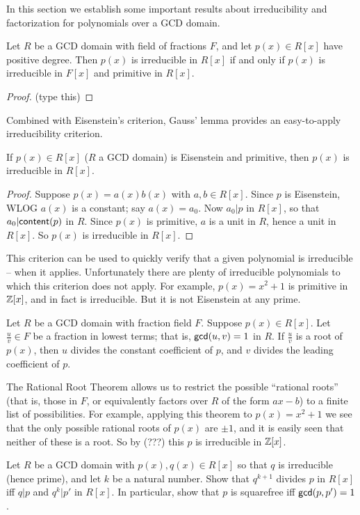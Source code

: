 In this section we establish some important results about irreducibility and factorization for polynomials over a GCD domain.

\begin{prop}
Let \(R\) be a GCD domain with field of fractions \(F\), and let \(p(x) \in R[x]\) have positive degree. Then \(p(x)\) is irreducible in \(R[x]\) if and only if \(p(x)\) is irreducible in \(F[x]\) and primitive in \(R[x]\).
\end{prop}

\begin{proof}
(type this)
\end{proof}

Combined with Eisenstein's criterion, Gauss' lemma provides an easy-to-apply irreducibility criterion.

\begin{cor}
If \(p(x) \in R[x]\) (\(R\) a GCD domain) is Eisenstein and primitive, then \(p(x)\) is irreducible in \(R[x]\).
\end{cor}

\begin{proof}
Suppose \(p(x) = a(x)b(x)\) with \(a,b \in R[x]\). Since \(p\) is Eisenstein, WLOG \(a(x)\) is a constant; say \(a(x) = a_0\). Now \(a_0|p\) in \(R[x]\), so that \(a_0|\mathsf{content}(p)\) in \(R\). Since \(p(x)\) is primitive, \(a\) is a unit in \(R\), hence a unit in \(R[x]\). So \(p(x)\) is irreducible in \(R[x]\).
\end{proof}

This criterion can be used to quickly verify that a given polynomial is irreducible -- when it applies. Unfortunately there are plenty of irreducible polynomials to which this criterion does not apply. For example, \(p(x) = x^2 + 1\) is primitive in \(\mathbb{Z}[x]\), and in fact is irreducible. But it is not Eisenstein at any prime.

\begin{prop}
Let \(R\) be a GCD domain with fraction field \(F\). Suppose \(p(x) \in R[x]\). Let \(\frac{u}{v} \in F\) be a fraction in lowest terms; that is, \(\mathsf{gcd}(u, v) = 1\) in \(R\). If \(\frac{u}{v}\) is a root of \(p(x)\), then \(u\) divides the constant coefficient of \(p\), and \(v\) divides the leading coefficient of \(p\).
\end{prop}

The Rational Root Theorem allows us to restrict the possible ``rational roots'' (that is, those in \(F\), or equivalently factors over \(R\) of the form \(ax-b\)) to a finite list of possibilities. For example, applying this theorem to \(p(x) = x^2 + 1\) we see that the only possible rational roots of \(p(x)\) are \(\pm 1\), and it is easily seen that neither of these is a root. So by (???) this \(p\) is irreducible in \(\mathbb{Z}[x]\).

\Exercises%

\begin{exercise}
Let \(R\) be a GCD domain with \(p(x), q(x) \in R[x]\) so that \(q\) is irreducible (hence prime), and let \(k\) be a natural number. Show that \(q^{k+1}\) divides \(p\) in \(R[x]\) iff \(q|p\) and \(q^k|p'\) in \(R[x]\). In particular, show that \(p\) is squarefree iff \(\mathsf{gcd}(p, p') = 1\). 
\end{exercise}
